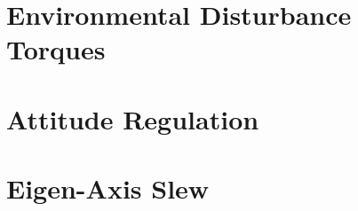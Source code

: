 \documentclass[11pt]{article}
\begin{document}
\section{Environmental Disturbance Torques}


\section{Attitude Regulation}


\section{Eigen-Axis Slew}




\end{document}
